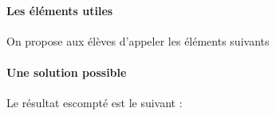 \documentclass[letterpaper,10pt,french]{sphinxmanual}
\begin{document}
\paragraph{Les éléments utiles}
\label{\detokenize{decouverte/pileface-python3:les-elements-utiles}}
On propose aux élèves d’appeler les éléments suivants

%
\begin{sphinxVerbatim}[commandchars=\\\{\}]
   
              
            
\end{sphinxVerbatim}


\paragraph{Une solution possible}
\label{\detokenize{decouverte/pileface-python3:une-solution-possible}}
Le résultat escompté est le suivant :
\end{document}
